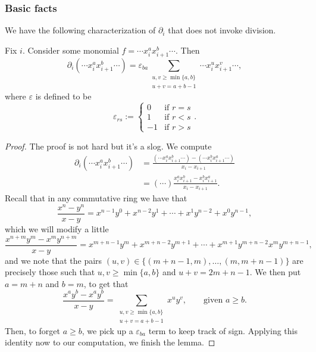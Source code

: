 \documentclass{article}
\begin{document}
\subsubsection{Basic facts}

We have the following characterization of $\partial_i$ that does not invoke division.

\begin{lemma}
    Fix $i$. Consider some monomial $f = \cdots x_i^ax_{i+1}^b \cdots$. Then
    \[
        \partial_i(\cdots x_i^a x_{i+1}^b \cdots) = 
        \varepsilon_{ba}
        \sum_{\substack{u,v \geq \min\{a,b\} \\ u+v = a+b-1}} \cdots x_i^u x_{i+1}^v \cdots,
    \]
    where $\varepsilon$ is defined to be
    \[
        \varepsilon_{rs} := \begin{cases}
            0 & \text{if } r = s \\
            1 & \text{if } r < s \\
            -1 & \text{if }r > s 
        \end{cases}.
    \]
\end{lemma}

\begin{proof}
    The proof is not hard but it's a slog. We compute
    \begin{align*}
        \partial_i(\cdots x_i^a x_{i+1}^b \cdots) &= \frac{(\cdots x_i^a x_{i+1}^b \cdots) - (\cdots x_i^b x_{i+1}^a \cdots)}{x_i-x_{i+1}} \\
                                                                          &= (\cdots) \frac{x_i^ax_{i+1}^b - x_i^bx_{i+1}^a}{x_i-x_{i+1}}.
    \end{align*}
    Recall that in any commutative ring we have that
    \[
        \frac{x^n-y^n}{x-y} = x^{n-1}y^0 + x^{n-2}y^1 + \cdots + x^1y^{n-2} + x^0y^{n-1},
    \]
    which we will modify a little
    \[
        \frac{x^{n+m}y^m-x^my^{n+m}}{x-y} = x^{m+n-1}y^m + x^{m+n-2}y^{m+1} + \cdots + x^{m+1}y^{m+n-2}x^my^{m+n-1},
    \]
    and we note that the pairs $(u,v) \in \{(m+n-1,m),\ldots,(m,m+n-1)\}$ are precisely those such that $u,v \geq \min\{a,b\}$ and $u+v = 2m+n-1$. We then put $a=m+n$ and $b=m$, to get that
    \[
        \frac{x^ay^b-x^ay^b}{x-y} = \sum_{\substack{u,v \geq \min\{a,b\}\\u+v=a+b-1}} x^uy^v, \qquad \text{given }a \geq b.
    \]
    Then, to forget $a \geq b$, we pick up a $\varepsilon_{ba}$ term to keep track of sign. 
    Applying this identity now to our computation, we finish the lemma.
\end{proof}
\end{document}
